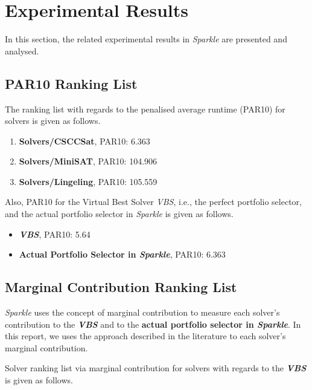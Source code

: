 \documentclass[british]{article}
\begin{document}
\section{Experimental Results}
\label{sec:Experimental_Results}

In this section, the related experimental results in \emph{Sparkle} are presented and analysed.

\subsection{PAR10 Ranking List}
\label{sec:PAR10_Ranking}

The ranking list with regards to the penalised average runtime (PAR10) for solvers is given as follows.

\begin{enumerate}
\item \textbf{Solvers/CSCCSat}, PAR10: 6.363
\item \textbf{Solvers/MiniSAT}, PAR10: 104.906
\item \textbf{Solvers/Lingeling}, PAR10: 105.559

\end{enumerate}

Also, PAR10 for the Virtual Best Solver \emph{VBS}, i.e., the perfect portfolio selector, and the actual portfolio selector in \emph{Sparkle} is given as follows.

\begin{itemize}
\item \textbf{\emph{VBS}}, PAR10: 5.64
\item \textbf{Actual Portfolio Selector in \emph{Sparkle}}, PAR10: 6.363
\end{itemize}

\subsection{Marginal Contribution Ranking List}
\label{sec:Marginal_Contribution_Ranking}

\emph{Sparkle} uses the concept of marginal contribution \cite{XuEtAl12} to measure each solver's contribution to the \textbf{\emph{VBS}} and to the \textbf{actual portfolio selector in \emph{Sparkle}}. In this report, we uses the approach described in the literature \cite{FreEtAl16} to each solver's marginal contribution.

Solver ranking list via marginal contribution \cite{XuEtAl12} for solvers with regards to the \textbf{{\em VBS}} is given as follows.
\end{document}
